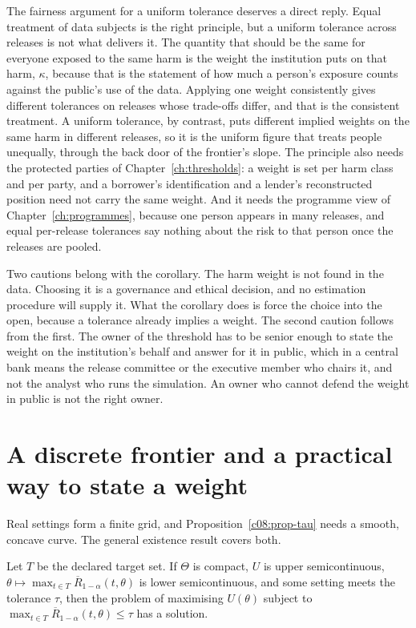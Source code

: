 The fairness argument for a uniform tolerance deserves a direct reply. Equal
treatment of data subjects is the right principle, but a uniform tolerance across
releases is not what delivers it. The quantity that should be the same for
everyone exposed to the same harm is the weight the institution puts on that harm,
$\kappa$, because that is the statement of how much a person's exposure counts
against the public's use of the data. Applying one weight consistently gives
different tolerances on releases whose trade-offs differ, and that is the
consistent treatment. A uniform tolerance, by contrast, puts different implied
weights on the same harm in different releases, so it is the uniform figure that
treats people unequally, through the back door of the frontier's slope. The
principle also needs the protected parties of Chapter~\ref{ch:thresholds}: a weight
is set per harm class and per party, and a borrower's identification and a lender's
reconstructed position need not carry the same weight. And it needs the programme
view of Chapter~\ref{ch:programmes}, because one person appears in many releases,
and equal per-release tolerances say nothing about the risk to that person once the
releases are pooled.

Two cautions belong with the corollary. The harm weight is not found in the data.
Choosing it is a governance and ethical decision, and no estimation procedure will
supply it. What the corollary does is force the choice into the open, because a
tolerance already implies a weight. The second caution follows from the first. The
owner of the threshold has to be senior enough to state the weight on the
institution's behalf and answer for it in public, which in a central bank means the
release committee or the executive member who chairs it, and not the analyst who
runs the simulation. An owner who cannot defend the weight in public is not the
right owner.

\section{A discrete frontier and a practical way to state a weight}\label{c08:sec-discrete}

Real settings form a finite grid, and Proposition~\ref{c08:prop-tau} needs a
smooth, concave curve. The general existence result covers both.

\begin{proposition}[Existence]\label{c08:prop-exist}
Let $T$ be the declared target set. If $\Theta$ is compact, $U$ is upper
semicontinuous, $\theta \mapsto \max_{t \in T}\overline{R}_{1-\alpha}(t,\theta)$ is
lower semicontinuous, and some setting meets the tolerance $\tau$, then the problem
of maximising $U(\theta)$ subject to
$\max_{t \in T}\overline{R}_{1-\alpha}(t,\theta) \le \tau$ has a solution.
\end{proposition}

